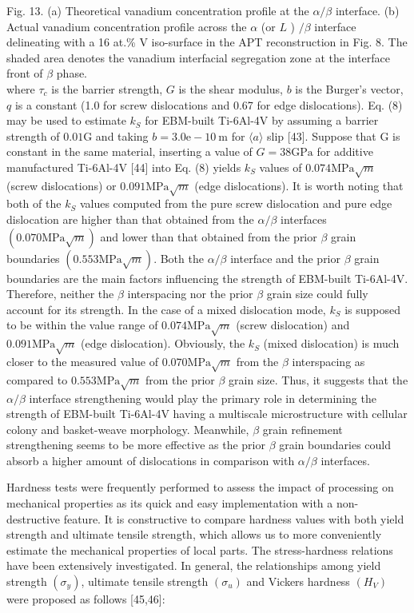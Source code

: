 \documentclass[10pt]{article}
\begin{document}
Fig. 13. (a) Theoretical vanadium concentration profile at the $\alpha / \beta$ interface. (b) Actual vanadium concentration profile across the $\alpha$ (or $L$ ) $/ \beta$ interface delineating with a 16 at.\% $\mathrm{V}$ iso-surface in the APT reconstruction in Fig. 8. The shaded area denotes the vanadium interfacial segregation zone at the interface front of $\beta$ phase.\\
where $\tau_{c}$ is the barrier strength, $G$ is the shear modulus, $b$ is the Burger's vector, $q$ is a constant (1.0 for screw dislocations and 0.67 for edge dislocations). Eq. (8) may be used to estimate $k_{S}$ for EBM-built Ti-6Al-4V by assuming a barrier strength of $0.01 \mathrm{G}$ and taking $b=3.0 \mathrm{e}-10 \mathrm{~m}$ for $\langle a\rangle$ slip [43]. Suppose that $\mathrm{G}$ is constant in the same material, inserting a value of $G=38 \mathrm{GPa}$ for additive manufactured Ti-6Al-4V [44] into Eq. (8) yields $k_{S}$ values of $0.074 \mathrm{MPa} \sqrt{m}$ (screw dislocations) or $0.091 \mathrm{MPa} \sqrt{m}$ (edge dislocations). It is worth noting that both of the $k_{S}$ values computed from the pure screw dislocation and pure edge dislocation are higher than that obtained from the $\alpha / \beta$ interfaces $(0.070 \mathrm{MPa} \sqrt{m})$ and lower than that obtained from the prior $\beta$ grain boundaries $(0.553 \mathrm{MPa} \sqrt{m})$. Both the $\alpha / \beta$ interface and the prior $\beta$ grain boundaries are the main factors influencing the strength of EBM-built Ti-6Al-4V. Therefore, neither the $\beta$ interspacing nor the prior $\beta$ grain size could fully account for its strength. In the case of a mixed dislocation mode, $k_{S}$ is supposed to be within the value range of $0.074 \mathrm{MPa} \sqrt{m}$ (screw dislocation) and $0.091 \mathrm{MPa} \sqrt{m}$ (edge dislocation). Obviously, the $k_{S}$ (mixed dislocation) is much closer to the measured value of $0.070 \mathrm{MPa} \sqrt{m}$ from the $\beta$ interspacing as compared to $0.553 \mathrm{MPa} \sqrt{m}$ from the prior $\beta$ grain size. Thus, it suggests that the $\alpha / \beta$ interface strengthening would play the primary role in determining the strength of EBM-built Ti-6Al-4V having a multiscale microstructure with cellular colony and basket-weave morphology. Meanwhile, $\beta$ grain refinement strengthening seems to be more effective as the prior $\beta$ grain boundaries could absorb a higher amount of dislocations in comparison with $\alpha / \beta$ interfaces.

Hardness tests were frequently performed to assess the impact of processing on mechanical properties as its quick and easy implementation with a non-destructive feature. It is constructive to compare hardness values with both yield strength and ultimate tensile strength, which allows us to more conveniently estimate the mechanical properties of local parts. The stress-hardness relations have been extensively investigated. In general, the relationships among yield strength $\left(\sigma_{y}\right)$, ultimate tensile strength $\left(\sigma_{u}\right)$ and Vickers hardness $\left(H_{V}\right)$ were proposed as follows [45,46]:
\end{document}
